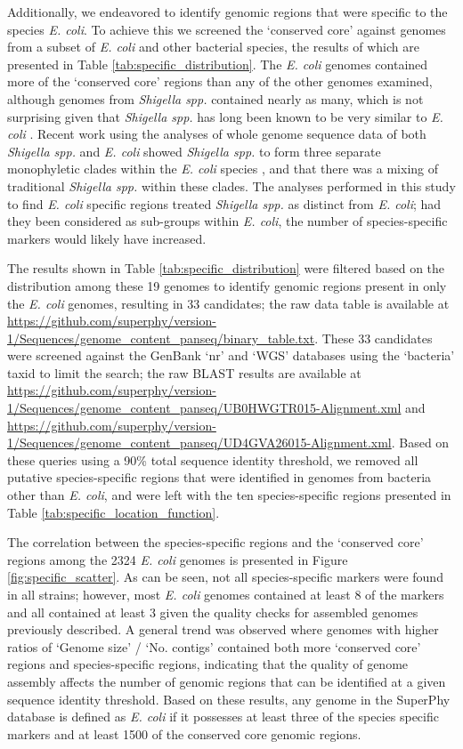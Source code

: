 \documentclass[doublespacing, linenumbers]{bmcart}
\begin{document}
Additionally, we endeavored to identify genomic regions that were specific to the species \textit{E. coli}. To achieve this we screened the `conserved core' against genomes from a subset of \textit{E. coli} and other bacterial species, the results of which are presented in Table \ref{tab:specific_distribution}. The \textit{E. coli} genomes contained more of the `conserved core' regions than any of the other genomes examined, although genomes from \textit{Shigella spp.} contained nearly as many, which is not surprising given that \textit{Shigella spp.} has long been known to be very similar to \textit{E. coli} \cite{pupo_multiple_2000}. Recent work using the analyses of whole genome sequence data of both \textit{Shigella spp.} and \textit{E. coli} showed \textit{Shigella spp.} to form three separate monophyletic clades within the \textit{E. coli} species \cite{sahl_defining_2015}, and that there was a mixing of traditional \textit{Shigella spp.} within these clades. The analyses performed in this study to find \textit{E. coli} specific regions treated \textit{Shigella spp.} as distinct from \textit{E. coli}; had they been considered as sub-groups within \textit{E. coli}, the number of species-specific markers would likely have increased.

 The results shown in Table \ref{tab:specific_distribution} were filtered based on the distribution among these 19 genomes to identify genomic regions present in only the \textit{E. coli} genomes, resulting in  33 candidates; the raw data table is available at \url{https://github.com/superphy/version-1/Sequences/genome_content_panseq/binary_table.txt}. These 33 candidates were screened against the GenBank `nr' and `WGS' databases using the `bacteria' taxid to limit the search; the raw BLAST results are available at \url{https://github.com/superphy/version-1/Sequences/genome_content_panseq/UB0HWGTR015-Alignment.xml} and \url{https://github.com/superphy/version-1/Sequences/genome_content_panseq/UD4GVA26015-Alignment.xml}. Based on these queries using a 90\% total sequence identity threshold, we removed all putative species-specific regions that were identified in genomes from bacteria other than \textit{E. coli}, and were left with the ten species-specific regions presented in Table \ref{tab:specific_location_function}.

The correlation between the species-specific regions and the `conserved core' regions among the 2324 \textit{E. coli} genomes is presented in Figure \ref{fig:specific_scatter}. As can be seen, not all species-specific markers were found in all strains; however, most \textit{E. coli} genomes contained at least 8 of the markers and all contained at least 3 given the quality checks for assembled genomes previously described. A general trend was observed where genomes with higher ratios of `Genome size' / `No. contigs' contained both more `conserved core' regions and species-specific regions, indicating that the quality of genome assembly affects the number of genomic regions that can be identified at a given sequence identity threshold. Based on these results, any genome in the SuperPhy database is defined as \textit{E. coli} if it possesses at least three of the species specific markers and at least 1500 of the conserved core genomic regions.
\end{document}
